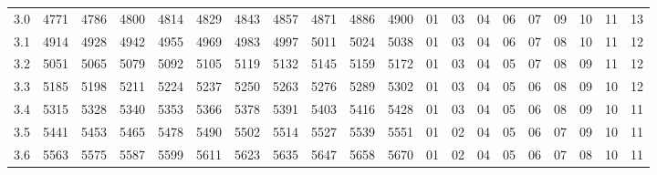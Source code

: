 \documentclass[12pt,UTF8,fontset=none]{ctexbook}
\begin{document}
\begin{appendix}
\begin{longtable}{|c| c c c c c | c c c c c| c c c c c c c c c|}
\scriptsize 3.0 & \scriptsize 4771 & \scriptsize 4786 & \scriptsize 4800 & \scriptsize 4814 & \scriptsize 4829 & \scriptsize 4843 & \scriptsize 4857 & \scriptsize 4871 & \scriptsize 4886 & \scriptsize 4900 & \scriptsize 01 & \scriptsize 03 & \scriptsize 04 & \scriptsize 06 & \scriptsize 07 & \scriptsize 09 & \scriptsize 10 & \scriptsize 11 & \scriptsize 13 \\
\scriptsize 3.1 & \scriptsize 4914 & \scriptsize 4928 & \scriptsize 4942 & \scriptsize 4955 & \scriptsize 4969 & \scriptsize 4983 & \scriptsize 4997 & \scriptsize 5011 & \scriptsize 5024 & \scriptsize 5038 & \scriptsize 01 & \scriptsize 03 & \scriptsize 04 & \scriptsize 06 & \scriptsize 07 & \scriptsize 08 & \scriptsize 10 & \scriptsize 11 & \scriptsize 12 \\
\scriptsize 3.2 & \scriptsize 5051 & \scriptsize 5065 & \scriptsize 5079 & \scriptsize 5092 & \scriptsize 5105 & \scriptsize 5119 & \scriptsize 5132 & \scriptsize 5145 & \scriptsize 5159 & \scriptsize 5172 & \scriptsize 01 & \scriptsize 03 & \scriptsize 04 & \scriptsize 05 & \scriptsize 07 & \scriptsize 08 & \scriptsize 09 & \scriptsize 11 & \scriptsize 12 \\
\scriptsize 3.3 & \scriptsize 5185 & \scriptsize 5198 & \scriptsize 5211 & \scriptsize 5224 & \scriptsize 5237 & \scriptsize 5250 & \scriptsize 5263 & \scriptsize 5276 & \scriptsize 5289 & \scriptsize 5302 & \scriptsize 01 & \scriptsize 03 & \scriptsize 04 & \scriptsize 05 & \scriptsize 06 & \scriptsize 08 & \scriptsize 09 & \scriptsize 10 & \scriptsize 12 \\
\scriptsize 3.4 & \scriptsize 5315 & \scriptsize 5328 & \scriptsize 5340 & \scriptsize 5353 & \scriptsize 5366 & \scriptsize 5378 & \scriptsize 5391 & \scriptsize 5403 & \scriptsize 5416 & \scriptsize 5428 & \scriptsize 01 & \scriptsize 03 & \scriptsize 04 & \scriptsize 05 & \scriptsize 06 & \scriptsize 08 & \scriptsize 09 & \scriptsize 10 & \scriptsize 11 \\
\scriptsize 3.5 & \scriptsize 5441 & \scriptsize 5453 & \scriptsize 5465 & \scriptsize 5478 & \scriptsize 5490 & \scriptsize 5502 & \scriptsize 5514 & \scriptsize 5527 & \scriptsize 5539 & \scriptsize 5551 & \scriptsize 01 & \scriptsize 02 & \scriptsize 04 & \scriptsize 05 & \scriptsize 06 & \scriptsize 07 & \scriptsize 09 & \scriptsize 10 & \scriptsize 11 \\
\scriptsize 3.6 & \scriptsize 5563 & \scriptsize 5575 & \scriptsize 5587 & \scriptsize 5599 & \scriptsize 5611 & \scriptsize 5623 & \scriptsize 5635 & \scriptsize 5647 & \scriptsize 5658 & \scriptsize 5670 & \scriptsize 01 & \scriptsize 02 & \scriptsize 04 & \scriptsize 05 & \scriptsize 06 & \scriptsize 07 & \scriptsize 08 & \scriptsize 10 & \scriptsize 11 \\

\end{longtable}
\end{appendix}
\end{document}
